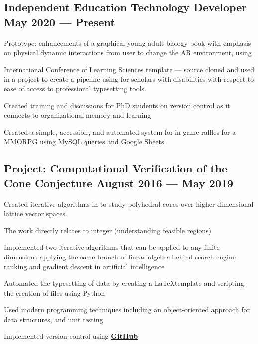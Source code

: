 \documentclass[letter,10pt]{article}
\begin{document}
\subsection{{Independent Education Technology Developer \hfill May 2020 --- Present}}
\begin{zitemize}
\item Prototype:  enhancements of a graphical young adult biology book with emphasis on physical dynamic interactions from user to change the AR environment, using 
\item International Conference of Learning Sciences \skills{\LaTeX} template --- source cloned and used in a project to create a pipeline using  for scholars with disabilities with respect to ease of access to professional typesetting tools.
\item Created training and discussions for PhD students on version control as it connects to organizational memory and learning
\item Created a simple, accessible, and automated system for in-game raffles for a MMORPG using MySQL queries and Google Sheets
\end{zitemize}


\subsection{Project: Computational Verification of the Cone Conjecture \hfill	August 2016 — May 2019}
\begin{zitemize}
\item Created iterative algorithms in  to study polyhedral cones over higher dimensional lattice vector spaces. \item The work directly relates to integer  (understanding feasible regions)
\item Implemented two iterative algorithms that can be applied to any finite dimensions applying the same branch of linear algebra behind search engine ranking and gradient descent in artificial intelligence
\item Automated the typesetting of data by creating a \LaTeX template and scripting the creation of files using Python
\item Used modern programming techniques including an object-oriented approach for data structures, and unit testing
\item Implemented version control using \href{https://github.com/TimmyChan/ConeThesis}{\bfseries{GitHub}} \end{zitemize}
\end{document}

